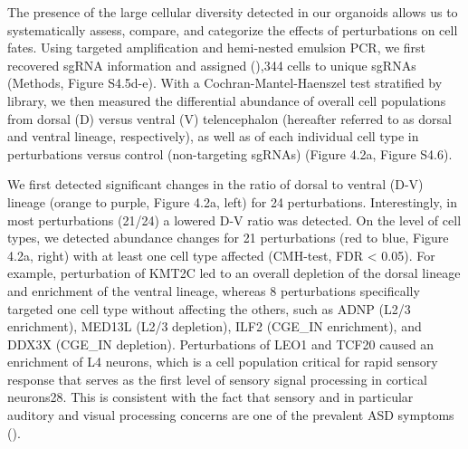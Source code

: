 The presence of the large cellular diversity detected in our organoids allows us to systematically assess, compare, and categorize the effects of perturbations on cell fates. Using targeted amplification and hemi-nested emulsion PCR, we first recovered sgRNA information and assigned (\cite{harris_neocortical_2015}),344 cells to unique sgRNAs (Methods, Figure S4.5d-e). With a Cochran-Mantel-Haenszel test stratified by library, we then measured the differential abundance of overall cell populations from dorsal (D) versus ventral (V) telencephalon (hereafter referred to as dorsal and ventral lineage, respectively), as well as of each individual cell type in perturbations versus control (non-targeting sgRNAs) (Figure 4.2a, Figure S4.6). 

We first detected significant changes in the ratio of dorsal to ventral (D-V) lineage (orange to purple, Figure 4.2a, left) for 24 perturbations. Interestingly, in most perturbations (21/24) a lowered D-V ratio was detected. On the level of cell types, we detected abundance changes for 21 perturbations (red to blue, Figure 4.2a, right) with at least one cell type affected (CMH-test, FDR < 0.05). For example, perturbation of KMT2C led to an overall depletion of the dorsal lineage and enrichment of the ventral lineage, whereas 8 perturbations specifically targeted one cell type without affecting the others, such as ADNP (L2/3 enrichment), MED13L (L2/3 depletion), ILF2 (CGE\_IN enrichment), and DDX3X (CGE\_IN depletion). Perturbations of LEO1 and TCF20 caused an enrichment of L4 neurons, which is a cell population critical for rapid sensory response that serves as the first level of sensory signal processing in cortical neurons28. This is consistent with the fact that sensory and in particular auditory and visual processing concerns are one of the prevalent ASD symptoms (\cite{marco_sensory_2011}). 

